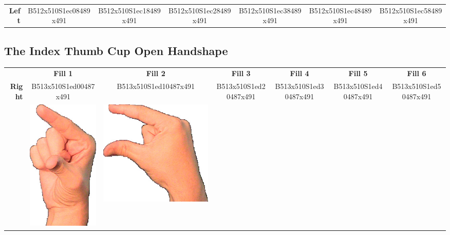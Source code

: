 \documentclass{article}
\begin{document}
\begin{center}
\begin{tabular}{r*{6}{c}}
\textbf{Left}&
B512x510S1ec08489x491&
B512x510S1ec18489x491&
B512x510S1ec28489x491&
B512x510S1ec38489x491&
B512x510S1ec48489x491&
B512x510S1ec58489x491\\
\end{tabular}
\end{center}

\subsection{The Index Thumb Cup Open Handshape}

\begin{center}
\begin{tabular}{r*{6}{c}}
&\textbf{Fill 1}&\textbf{Fill 2}&\textbf{Fill 3}&\textbf{Fill 4}&\textbf{Fill 5}&\textbf{Fill 6}\\
\multirow{2}{*}{\textbf{Right}}&
B513x510S1ed00487x491&
B513x510S1ed10487x491&
B513x510S1ed20487x491&
B513x510S1ed30487x491&
B513x510S1ed40487x491&
B513x510S1ed50487x491\\
&
\includegraphics[scale=0.1]{images/09-11-1.jpg}&
\includegraphics[scale=0.1]{images/09-11-2.jpg}&

\end{tabular}
\end{center}
\end{document}
